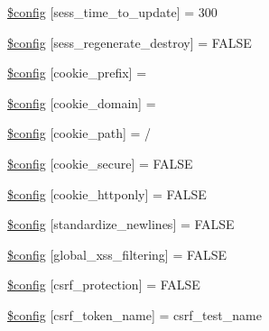 \begin{DoxyCompactItemize}
\item 
\hyperlink{application_2config_2config_8php_afb6a66c470a9c08b90efcbc6c5594573}{\$config} \mbox{[}\textquotesingle{}sess\+\_\+time\+\_\+to\+\_\+update\textquotesingle{}\mbox{]} = 300
\item 
\hyperlink{application_2config_2config_8php_a48025f8c051fea6ea7893d8bb1deb58f}{\$config} \mbox{[}\textquotesingle{}sess\+\_\+regenerate\+\_\+destroy\textquotesingle{}\mbox{]} = F\+A\+L\+S\+E
\item 
\hyperlink{application_2config_2config_8php_ae5f35eb62ffdcfa1878ed13fa47b2d5d}{\$config} \mbox{[}\textquotesingle{}cookie\+\_\+prefix\textquotesingle{}\mbox{]} = \textquotesingle{}\textquotesingle{}
\item 
\hyperlink{application_2config_2config_8php_a4f967865afe18263372e9c66223a752e}{\$config} \mbox{[}\textquotesingle{}cookie\+\_\+domain\textquotesingle{}\mbox{]} = \textquotesingle{}\textquotesingle{}
\item 
\hyperlink{application_2config_2config_8php_aeadefdcde429770b04a079e002194d2f}{\$config} \mbox{[}\textquotesingle{}cookie\+\_\+path\textquotesingle{}\mbox{]} = \textquotesingle{}/\textquotesingle{}
\item 
\hyperlink{application_2config_2config_8php_a7d66abd075b76c2fdcd0837068a13b51}{\$config} \mbox{[}\textquotesingle{}cookie\+\_\+secure\textquotesingle{}\mbox{]} = F\+A\+L\+S\+E
\item 
\hyperlink{application_2config_2config_8php_aef80aa5675d48ec14b755bd538cafe8b}{\$config} \mbox{[}\textquotesingle{}cookie\+\_\+httponly\textquotesingle{}\mbox{]} = F\+A\+L\+S\+E
\item 
\hyperlink{application_2config_2config_8php_a78062f90b7914266529217f31dd050ed}{\$config} \mbox{[}\textquotesingle{}standardize\+\_\+newlines\textquotesingle{}\mbox{]} = F\+A\+L\+S\+E
\item 
\hyperlink{application_2config_2config_8php_afee3589eecfa5ebecf39f44c271d58ce}{\$config} \mbox{[}\textquotesingle{}global\+\_\+xss\+\_\+filtering\textquotesingle{}\mbox{]} = F\+A\+L\+S\+E
\item 
\hyperlink{application_2config_2config_8php_a37f959c7a92cefa11c0df7db2b83c89f}{\$config} \mbox{[}\textquotesingle{}csrf\+\_\+protection\textquotesingle{}\mbox{]} = F\+A\+L\+S\+E
\item 
\hyperlink{application_2config_2config_8php_af0e5ccff5383b00a56f4ad3ee0d289d2}{\$config} \mbox{[}\textquotesingle{}csrf\+\_\+token\+\_\+name\textquotesingle{}\mbox{]} = \textquotesingle{}csrf\+\_\+test\+\_\+name\textquotesingle{}

\end{DoxyCompactItemize}
